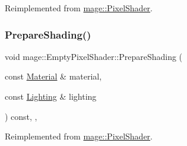 Reimplemented from \hyperlink{classmage_1_1_pixel_shader_ab677013145ca252c57e5a001134c01ff}{mage\+::\+Pixel\+Shader}.

\hypertarget{classmage_1_1_empty_pixel_shader_a42bdcb8c416ad76bed9437fb2af91252}{}\label{classmage_1_1_empty_pixel_shader_a42bdcb8c416ad76bed9437fb2af91252} 
\subsubsection{\texorpdfstring{Prepare\+Shading()}{PrepareShading()}\hspace{0.1cm}{\footnotesize\ttfamily [2/2]}}
{\footnotesize\ttfamily void mage\+::\+Empty\+Pixel\+Shader\+::\+Prepare\+Shading (\begin{DoxyParamCaption}\item[{const \hyperlink{structmage_1_1_material}{Material} \&}]{material,  }\item[{const \hyperlink{structmage_1_1_lighting}{Lighting} \&}]{lighting }\end{DoxyParamCaption}) const\hspace{0.3cm}{\ttfamily [final]}, {\ttfamily [override]}, {\ttfamily [virtual]}}



Reimplemented from \hyperlink{classmage_1_1_pixel_shader_a5a1a58bcb0ed64405e746ec7a5af5269}{mage\+::\+Pixel\+Shader}.

